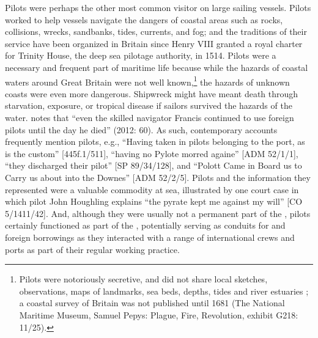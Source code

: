 Pilots were perhaps the other most common visitor on large sailing vessels. Pilots worked to help vessels navigate the dangers of coastal areas such as rocks, collisions, wrecks, sandbanks, tides, currents, and fog; and the traditions of their service have been organized in Britain since Henry VIII granted a royal charter for Trinity House, the deep sea pilotage authority, in 1514. Pilots were a necessary and frequent part of maritime life because while the hazards of coastal waters around Great Britain were not well known,\footnote{Pilots were notoriously secretive, and did not share local sketches, observations, maps of landmarks, sea beds, depths, tides and river estuaries \citep[64]{Bicheno2012}; a coastal survey of Britain was not published until 1681 (The National Maritime Museum, Samuel Pepys: Plague, Fire, Revolution, exhibit G218: 11/25).}  the hazards of unknown coasts were even more dangerous. Shipwreck might have meant death through starvation, exposure, or tropical disease if sailors survived the hazards of the water. \citeauthor{Bicheno2012} notes that “even the skilled navigator Francis  continued to use foreign pilots until the day he died” (2012: 60). As such, contemporary accounts frequently mention pilots, e.g., “Having taken in pilots belonging to the port, as is the custom” [445f.1/511], “having no Pylote morred againe” [ADM 52/1/1], “they discharged their pilot” [SP 89/34/128], and “Polott Came in Board us to Carry us about into the Downes” [ADM 52/2/5]. Pilots and the information they represented were a valuable commodity at sea, illustrated by one court case in which pilot John Houghling explains “the pyrate kept me against my will” [CO 5/1411/42]. And, although they were usually not a permanent part of the , pilots certainly functioned as part of the , potentially serving as conduits for  and foreign borrowings as they interacted with a range of international crews and ports as part of their regular working practice. 

